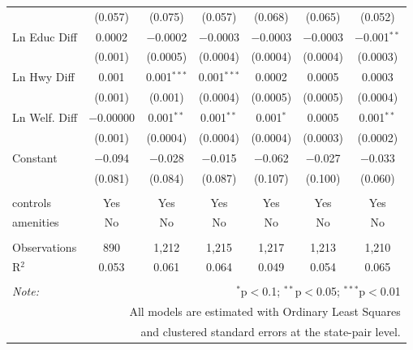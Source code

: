 \begin{table}[!htbp]
\begin{tabular}{@{\extracolsep{5pt}}lcccccc}
  & (0.057) & (0.075) & (0.057) & (0.068) & (0.065) & (0.052) \\ 
  Ln Educ Diff & 0.0002 & $-$0.0002 & $-$0.0003 & $-$0.0003 & $-$0.0003 & $-$0.001$^{**}$ \\ 
  & (0.001) & (0.0005) & (0.0004) & (0.0004) & (0.0004) & (0.0003) \\ 
  Ln Hwy Diff & 0.001 & 0.001$^{***}$ & 0.001$^{***}$ & 0.0002 & 0.0005 & 0.0003 \\ 
  & (0.001) & (0.001) & (0.0004) & (0.0005) & (0.0005) & (0.0004) \\ 
  Ln Welf. Diff & $-$0.00000 & 0.001$^{**}$ & 0.001$^{**}$ & 0.001$^{*}$ & 0.0005 & 0.001$^{**}$ \\ 
  & (0.001) & (0.0004) & (0.0004) & (0.0004) & (0.0003) & (0.0002) \\ 
  Constant & $-$0.094 & $-$0.028 & $-$0.015 & $-$0.062 & $-$0.027 & $-$0.033 \\ 
  & (0.081) & (0.084) & (0.087) & (0.107) & (0.100) & (0.060) \\ 
 \hline \\[-1.8ex] 
controls & Yes & Yes & Yes & Yes & Yes & Yes \\ 
amenities & No & No & No & No & No & No \\ 
\hline \\[-1.8ex] 
Observations & 890 & 1,212 & 1,215 & 1,217 & 1,213 & 1,210 \\ 
R$^{2}$ & 0.053 & 0.061 & 0.064 & 0.049 & 0.054 & 0.065 \\ 
\hline 
\hline \\[-1.8ex] 
\textit{Note:}  & \multicolumn{6}{r}{$^{*}$p$<$0.1; $^{**}$p$<$0.05; $^{***}$p$<$0.01} \\ 
 & \multicolumn{6}{r}{All models are estimated with Ordinary Least Squares} \\ 
 & \multicolumn{6}{r}{and clustered standard errors at the state-pair level.} \\ 
\end{tabular} 
\end{table} 

